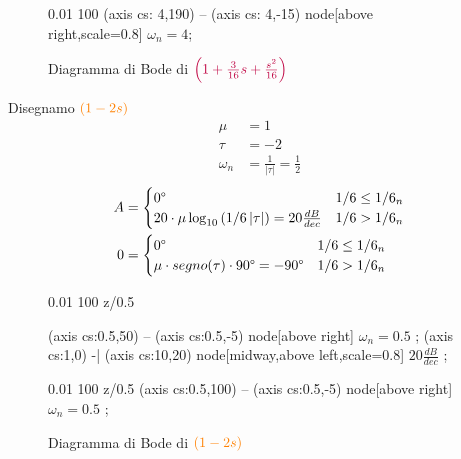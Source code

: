 \documentclass[a4paper]{article}
\begin{document}
\begin{example}
\begin{figure}[H]
\begin{BodePhPlot}[scale=1.5,ytick distance=90,ylabel={Fase (deg)},xlabel={Frequenza (rad/s)}] {0.01} {100}
         (axis cs: 4,190) -- (axis cs: 4,-15) node[above right,scale=0.8] {\( \omega_n = 4 \)};
      \end{BodePhPlot}
      \caption{Diagramma di Bode di 
      \( \color{purple} \left( 1 + \frac{3}{16}s + \frac{s ^2}{16} \right)  \)}
    \end{figure}

    \vspace{1em}
    \noindent
    Disegnamo \( \color{orange} \left( 1 - 2s \right)  \)
    \[
    \begin{aligned}
      \mu &= 1\\
      \tau &= -2\\
      \omega_n &= \frac{1}{|\tau|} = \frac{1}{2}
    \end{aligned}
    \] 
    \[
    \begin{aligned}
      A &= \begin{cases}
        0\degree & 1/6 \le 1/6_n\\
        20 \cdot \mu \log_{10} \left( 1/6 \left| \tau \right|  \right) = 20 \frac{dB}{dec} & 1/6 > 1/6_n
      \end{cases}\\
        0 &= \begin{cases}
          0\degree & 1/6 \le 1/6_n\\
          \mu \cdot segno(\tau) \cdot 90\degree = -90\degree & 1/6 > 1/6_n
        \end{cases}
    \end{aligned}
    \] 
    \begin{figure}[H]
      \centering
      \begin{BodeMagPlot}[scale=1.5,ytick distance=20,ylabel={Ampiezza (dB)}] {0.01} {100}
        {
          z/0.5
        }

         (axis cs:0.5,50) -- (axis cs:0.5,-5) node[above right] {\( \omega_n = 0.5 \) };
         (axis cs:1,0) -| (axis cs:10,20) 
        node[midway,above left,scale=0.8] {\( 20 \frac{dB}{dec} \) };
      \end{BodeMagPlot}

      \begin{BodePhPlot}[
        scale=1.5,ytick distance=90,ylabel={Fase (deg)},xlabel={Frequenza (rad/s)},
        ] {0.01} {100}
        {
          z/0.5
        }
         (axis cs:0.5,100) -- (axis cs:0.5,-5) node[above right] {\( \omega_n = 0.5 \) };
      \end{BodePhPlot}
      \caption{Diagramma di Bode di \( \color{orange} \left( 1 - 2s \right)  \)}
    \end{figure}
\end{example}
\end{document}
